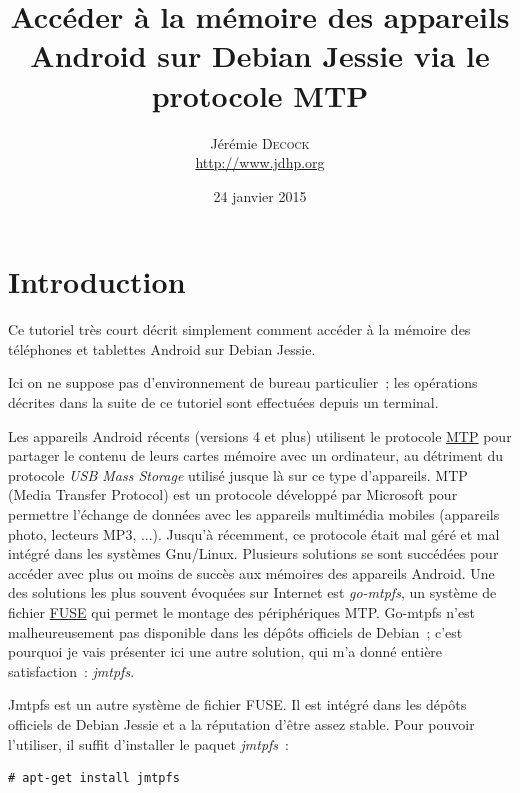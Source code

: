 \documentclass{article}
\title{Accéder à la mémoire des appareils Android sur Debian Jessie via le protocole MTP}
\author{Jérémie \textsc{Decock} \\ \url{http://www.jdhp.org}}
\date{24 janvier 2015}
\begin{document}
\maketitle



\section*{Introduction}\label{sec:intro}

Ce tutoriel très court décrit simplement comment accéder à la mémoire
des téléphones et tablettes Android sur Debian Jessie.

Ici on ne suppose pas d'environnement de bureau particulier~; les
opérations décrites dans la suite de ce tutoriel sont effectuées depuis un
terminal.

Les appareils Android récents (versions 4 et plus) utilisent le protocole
\href{http://fr.wikipedia.org/wiki/Media_Transfer_Protocol}{MTP} pour partager
le contenu de leurs cartes mémoire avec un ordinateur, au détriment du
protocole {\em USB Mass Storage} utilisé jusque là sur ce type d'appareils.
MTP (Media Transfer Protocol) est un protocole développé par Microsoft pour
permettre l'échange de données avec les appareils multimédia mobiles (appareils
photo, lecteurs MP3, ...).
Jusqu'à récemment, ce protocole était mal géré et mal intégré dans les
systèmes Gnu/Linux. Plusieurs solutions se sont succédées pour accéder avec plus ou
moins de succès aux mémoires des appareils Android.
Une des solutions les plus souvent évoquées sur Internet est {\em go-mtpfs},
un système de fichier
\href{http://fr.wikipedia.org/wiki/Filesystem_in_Userspace}{FUSE} qui permet le
montage des périphériques MTP.
Go-mtpfs n'est malheureusement pas disponible dans les dépôts officiels de
Debian~; c'est pourquoi je vais présenter ici une autre solution, qui m'a donné
entière satisfaction~: {\em jmtpfs}.

Jmtpfs est un autre système de fichier FUSE. Il est intégré dans
les dépôts officiels de Debian Jessie et a la réputation d'être assez stable.
Pour pouvoir l'utiliser, il suffit d'installer le paquet {\em jmtpfs}~:
\begin{verbatim}
# apt-get install jmtpfs
\end{verbatim}

\end{document}
